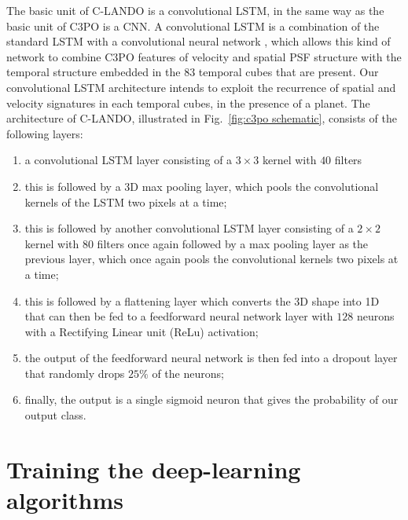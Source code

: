 \documentclass[referee]{aa} %
\begin{document}
The basic unit of C-LANDO is a convolutional LSTM, in the same way as the basic unit of C3PO is a CNN. A convolutional LSTM is a combination of the standard LSTM \citep{1997HocherieterLSTM} with a convolutional neural network \citep{1990ZhangCNN}, which allows this kind of network to combine C3PO features of velocity and spatial PSF structure with the temporal structure embedded in the $83$ temporal cubes that are present. 
Our convolutional LSTM architecture intends to exploit the recurrence of spatial and velocity signatures in each temporal cubes, in the presence of a planet.
The architecture of C-LANDO, illustrated in Fig.~\ref{fig:c3po schematic}, consists of the following layers:
\begin{enumerate}
    \item a convolutional LSTM layer consisting of a $3\times3$ kernel with $40$ filters 
    \item  this is followed by a 3D max pooling layer, which pools the convolutional kernels of the LSTM two pixels at a time;
    \item this is followed by another convolutional LSTM layer consisting of a $2\times2$ kernel with $80$ filters once again followed by a max pooling layer as the previous layer, which once again pools the convolutional kernels two pixels at a time;
    \item  this is followed by a flattening layer which converts the 3D shape into 1D that can then be fed to a feedforward neural network layer  with $128$ neurons with a Rectifying Linear unit (ReLu) activation;
    \item the output of the feedforward neural network is then fed into a dropout layer that randomly drops $25\%$ of the neurons;
    \item finally, the output is a single sigmoid neuron that gives the probability of our output class.
\end{enumerate}
    


\section{Training the deep-learning algorithms}\label{sec: training ML}
\end{document}
